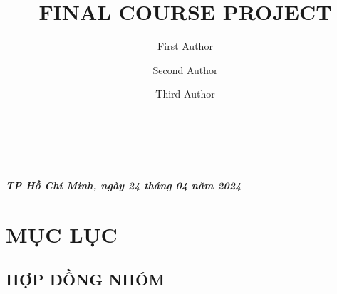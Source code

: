 \documentclass[article]{llncs}
\begin{document}
\begin{titlepage}
\begin{minipage}{1.5\textwidth}
\begin{flushleft}
\end{flushleft}
\end{minipage}
~
\begin{flushright}\large
\emph{}\\
\textbf{\textit{TP Hồ Chí Minh, ngày 24 tháng 04 năm 2024}}\\
\end{flushright}



\vfill 

\end{titlepage}

\dominitoc[n]
\chapter{MỤC LỤC}
\minitoc

\newpage

\title{FINAL COURSE PROJECT}
%
%
\author{First Author \and
Second Author \and
Third Author}
%
%
%
\maketitle              %
%

\section{HỢP ĐỒNG NHÓM}
\end{document}
